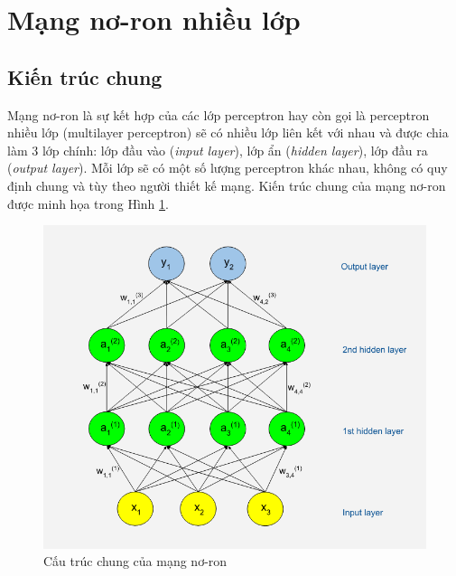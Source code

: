 \section{Mạng nơ-ron nhiều lớp}
\subsection{Kiến trúc chung}
\label{sec:layer}
Mạng nơ-ron là sự kết hợp của các lớp perceptron hay còn gọi là perceptron nhiều lớp (multilayer perceptron) sẽ có nhiều lớp liên kết với nhau và được chia làm 3 lớp chính: lớp đầu vào (\textit{input layer}), lớp ẩn (\textit{hidden layer}), lớp đầu ra (\textit{output layer}). Mỗi lớp sẽ có một số lượng perceptron khác nhau, không có quy định chung và tùy theo người thiết kế mạng. Kiến trúc chung của mạng nơ-ron được minh họa trong Hình \ref{fig:neuralNetworkStruct}.
\begin{center}
 	\begin{figure}[H]
    \begin{center}
     \includegraphics[scale=0.8]{chap3/image/cautrucNN.png}
    \end{center}
    \caption{Cấu trúc chung của mạng nơ-ron}
    \label{fig:neuralNetworkStruct}
    \end{figure}
\end{center}

